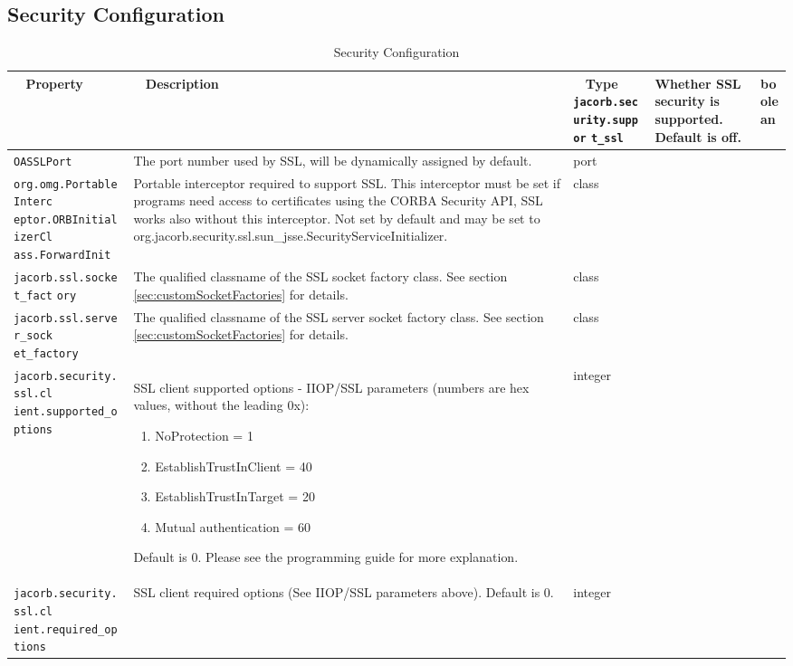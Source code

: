\subsection{Security Configuration}
\begin{small}
\begin{longtable}{|p{5cm}|p{9cm}|p{2cm}|}
\caption{Security Configuration}\\
\hline
~ \hfill \textbf {Property} \hfill ~ & ~ \hfill \textbf {Description} \hfill ~ & ~ \hfill \textbf {Type} \hfill ~ \endhead
\hline
\verb"jacorb.security.suppor"
\verb"t_ssl" & Whether SSL security is supported. Default is off. & boolean \\
\hline
\verb"OASSLPort" & The port number used by SSL, will be dynamically assigned by default. & port \\
\hline
\verb"org.omg.PortableInterc"
\verb"eptor.ORBInitializerCl"
\verb"ass.ForwardInit" & Portable interceptor required to support SSL. This interceptor must be set if programs need access to certificates using the CORBA Security API, SSL works also without this interceptor. Not set by default and may be set to org.jacorb.security.ssl.sun\_jsse.SecurityServiceInitializer. & class \\
\hline
\verb"jacorb.ssl.socket_fact"
\verb"ory" & The qualified classname of the SSL socket factory class. See section \ref{sec:customSocketFactories} for details.& class \\
\hline
\verb"jacorb.ssl.server_sock"
\verb"et_factory" & The qualified classname of the SSL server socket factory class. See section \ref{sec:customSocketFactories} for details.& class \\
\hline
\verb"jacorb.security.ssl.cl"
\verb"ient.supported_options" & SSL client supported options - IIOP/SSL parameters (numbers are hex values, without the leading 0x):
\begin{enumerate}
\item NoProtection = 1
\item EstablishTrustInClient = 40
\item EstablishTrustInTarget = 20
\item Mutual authentication = 60
\end{enumerate}
Default is 0. Please see the programming guide for more explanation. & integer \\
\hline
\verb"jacorb.security.ssl.cl"
\verb"ient.required_options" & SSL client required options (See IIOP/SSL parameters above). Default is 0. & integer \\
\hline

\end{longtable}
\end{small}
